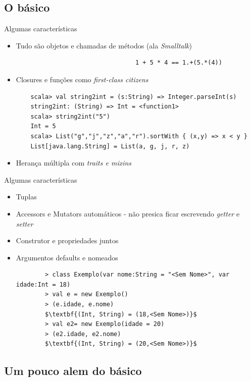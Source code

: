 \documentclass{beamer}
\begin{document}
\subsection{O básico}

\begin{frame}[fragile]{Algumas características} 
    \begin{itemize} [<+->]
        \item Tudo são objetos e chamadas de métodos (ala \emph{Smalltalk})
	\begin{lstlisting}
		                         1 + 5 * 4 == 1.+(5.*(4))
	 \end{lstlisting}
        \item Closures e funções como \emph{first-class citizens}
	\begin{lstlisting}
	scala> val string2int = (s:String) => Integer.parseInt(s)	
	string2int: (String) => Int = <function1>
	scala> string2int("5")
	Int = 5
	scala> List("g","j","z","a","r").sortWith { (x,y) => x < y }
	List[java.lang.String] = List(a, g, j, r, z)
	\end{lstlisting}
         \item Herança múltipla com \emph{traits e mixins}
    \end{itemize}
\end{frame}

\begin{frame}[fragile]{Algumas características} 
    \begin{itemize} %
        \item Tuplas
        \item Accessors e Mutators automáticos - não presica ficar escrevendo \emph{getter} e  \emph{setter}
        \item Construtor e propriedades juntos
        \item Argumentos defaults e nomeados
		\begin{lstlisting}
		> class Exemplo(var nome:String = "<Sem Nome>", var idade:Int = 18)
		> val e = new Exemplo()
		> (e.idade, e.nome)
		$\textbf{(Int, String) = (18,<Sem Nome>)}$
		> val e2= new Exemplo(idade = 20)
		> (e2.idade, e2.nome)
		$\textbf{(Int, String) = (20,<Sem Nome>)}$
		\end{lstlisting}
    \end{itemize}
\end{frame}

\subsection{Um pouco alem do básico}
\end{document}
